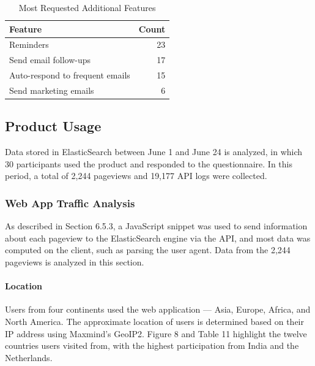 \documentclass{article}
\begin{document}
\begin{table}[!htb]
	\begin{minipage}{1\linewidth}
		\caption{Most Requested Additional Features}
		\centering
		\begin{tabular}{lr}
			\hline
			\textbf{Feature}                & \textbf{Count} \\
			\hline
			Reminders                       & 23             \\
			Send email follow-ups           & 17             \\
			Auto-respond to frequent emails & 15             \\
			Send marketing emails           & 6              \\
			\hline
		\end{tabular}
	\end{minipage}%
\end{table}

\subsection{Product Usage}

Data stored in ElasticSearch between June 1 and June 24 is analyzed, in which 30 participants used the product and responded to the questionnaire. In this period, a total of 2,244 pageviews and 19,177 API logs were collected.

\subsubsection{Web App Traffic Analysis}

As described in Section 6.5.3, a JavaScript snippet was used to send information about each pageview to the ElasticSearch engine via the API, and most data was computed on the client, such as parsing the user agent. Data from the 2,244 pageviews is analyzed in this section.

\paragraph{Location}

Users from four continents used the web application --- Asia, Europe, Africa, and North America. The approximate location of users is determined based on their IP address using Maxmind's GeoIP2. Figure 8 and Table 11 highlight the twelve countries users visited from, with the highest participation from India and the Netherlands.
\end{document}

